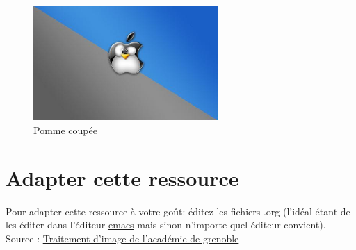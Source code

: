 \documentclass[11pt]{article}
\begin{document}
\begin{figure}[htbp]
\centering
\includegraphics[width=7cm]{pommemisgrise.jpg}
\caption{Pomme coupée}
\end{figure}


\section{Adapter cette ressource}
\label{sec:orgb220928}
Pour adapter cette ressource à votre goût: éditez les fichiers .org (l'idéal étant de les éditer dans l'éditeur \href{https://linuxfr.org/users/postroutine/journaux/pourquoi-emacs-premiere-partie}{emacs} mais sinon n'importe quel éditeur convient). 
Source : \href{http://www.ac-grenoble.fr/disciplines/informatiquelycee/n\_site/snt\_photo\_transImg.html}{Traitement d'image de l'académie de grenoble}
\end{document}
